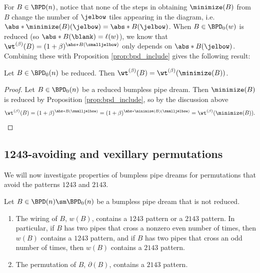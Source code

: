 For $B\in \BPD(n)$, notice that none of the steps in obtaining $\minimize(B)$ from $B$ change the number of $\jelbow$ tiles appearing in the diagram, i.e.
$\abs*{\minimize(B)(\jelbow)} = \abs*{B(\jelbow)}$.
When $B\in \BPD_0(w)$ is reduced (so $\abs*{B(\blank)} = \ell(w)$), we know that $\wt^{(\beta)}(B) = (1+\beta)^{\abs*{B(\smalljelbow)}}$ only depends on $\abs*{B(\jelbow)}$.
Combining these with Proposition \ref{prop:bpd_include} gives the following result:

\begin{proposition}
\label{prop:bpd_weight}
    Let $B\in \BPD_0(n)$ be reduced.
    Then $\wt^{(\beta)}(B) = \wt^{(\beta)}(\minimize(B))$.
\end{proposition}

\begin{proof}
    Let $B\in \BPD_0(n)$ be a reduced bumpless pipe dream.
    Then $\minimize(B)$ is reduced by Proposition \ref{prop:bpd_include}, so by the discussion above \[
        \wt^{(\beta)}(B) =
        (1+\beta)^{\abs*{B(\smalljelbow)}} =
        (1+\beta)^{\abs*{\minimize(B)(\smalljelbow)}} =
        \wt^{(\beta)}(\minimize(B)). \qedhere
    \]
\end{proof}



\subsection{1243-avoiding and vexillary permutations}
\label{sect:1243_2143}

We will now investigate properties of bumpless pipe dreams for permutations that avoid the patterns $1243$ and $2143$.

\begin{proposition}
\label{prop:BPD_nonred_1243_2143}
    Let $B\in \BPD(n) \sm \BPD_0(n)$ be a bumpless pipe dream that is not reduced.
    \begin{enumerate}
        \item[(a)] The wiring of $B$, $w(B)$, contains a $1243$ pattern or a $2143$ pattern.
        In particular, if $B$ has two pipes that cross a nonzero even number of times, then $w(B)$ contains a $1243$ pattern, and if $B$ has two pipes that cross an odd number of times, then $w(B)$ contains a $2143$ pattern.
        \item[(b)] The permutation of $B$, $\partial(B)$, contains a $2143$ pattern.
    \end{enumerate}
\end{proposition}

